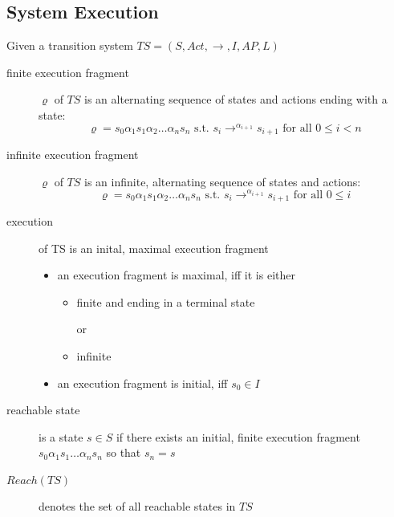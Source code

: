 \documentclass[a4paper, 10pt]{article}
\begin{document}
\subsection*{System Execution}
Given a transition system $TS=\left(S,Act,\to,I,AP,L\right)$
\begin{description}
    \item[finite execution fragment] $\varrho$ of $TS$ is an alternating sequence of states and actions ending with a state:
    \[ \varrho = s_0\alpha_1 s_1\alpha_2\dots\alpha_n s_n \textrm{ s.t. } s_i\to^{\alpha_{i+1}} s_{i+1} \textrm{ for all } 0\leq i<n \]
    \item[infinite execution fragment] $\varrho$ of $TS$ is an infinite, alternating sequence of states and actions:
    \[ \varrho = s_0\alpha_1 s_1\alpha_2\dots\alpha_n s_n \textrm{ s.t. } s_i\to^{\alpha_{i+1}} s_{i+1} \textrm{ for all } 0\leq i \]
    \item[execution] of TS is an inital, maximal execution fragment
    \begin{itemize}
        \item an execution fragment is maximal, iff it is either
        \begin{itemize}
            \item finite and ending in a terminal state
            \item[or]
            \item infinite
        \end{itemize}
        \item an execution fragment is initial, iff $s_0\in I$
    \end{itemize}
    \item[reachable state] is a state $s\in S$ if there exists an initial, finite execution fragment $s_0\alpha_1s_1\dots\alpha_ns_n$ so that $s_n=s$
    \item[$Reach(TS)$] denotes the set of all reachable states in $TS$ \\
    \scalebox{1}{}
\end{description}
\end{document}
